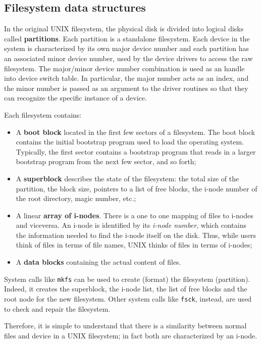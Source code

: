 \subsection{Filesystem data structures}
In the original UNIX filesystem, the physical disk is divided into logical disks called \textbf{partitions}. Each partition is a standalone filesystem. Each device in the system is characterized by its own major device number and each partition has an associated minor device number, used by the device drivers to access the raw filesystem. The major/minor device number combination is used as an handle into device switch table. In particular, the major number acts as an index, and the minor number is passed as an argument to the driver routines so that they can recognize the specific instance of a device.

Each filesystem contains:
\begin{itemize}
\item A \textbf{boot block} located in the first few sectors of a filesystem. The boot block contains the initial bootstrap program used to load the operating system. Typically, the first sector contains a bootstrap program that reads in a larger bootstrap program from the next few sector, and so forth;
\item A \textbf{superblock} describes the state of the filesystem: the total size of the partition, the block size, pointers to a list of free blocks, the i-node number of the root directory, magic number, etc.;
\item A linear \textbf{array of i-nodes}. There is a one to one mapping of files to i-nodes and viceversa. An i-node is identified by its \emph{i-node number}, which  contains the information needed to find the i-node itself on the disk. Thus, while users think of files in terms of file names, UNIX thinks of files in terms of i-nodes;
\item A \textbf{data blocks} containing the actual content of files.
\end{itemize}

System calls like \texttt{mkfs} can be used to create (format) the filesystem (partition). Indeed, it creates the superblock, the i-node list, the list of free blocks and the root node for the new filesystem. Other system calls like \texttt{fsck}, instead, are used to check and repair the filesystem.

Therefore, it is simple to understand that there is a similarity between normal files and device in a UNIX filesystem; in fact both are characterized by an i-node.

